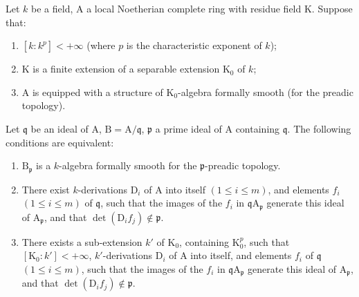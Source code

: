\begin{theorem}[22.7.3]
\label{0.22.7.3}
Let $k$ be a field, $\mathrm{A}$ a local Noetherian complete ring with residue field $\mathrm{K}$.
Suppose that:
\begin{enumerate}
  \item[$1^\circ$] $[k:k^p]<+\infty$ (where $p$ is the characteristic exponent of $k$);
  \item[$2^\circ$] $\mathrm{K}$ is a finite extension of a separable extension $\mathrm{K}_0$ of $k$;
  \item[$3^\circ$] $\mathrm{A}$ is equipped with a structure of $\mathrm{K}_0$-algebra formally smooth (for the preadic topology).
\end{enumerate}
Let $\mathfrak{q}$ be an ideal of $\mathrm{A}$, $\mathrm{B}=\mathrm{A}/\mathfrak{q}$, $\mathfrak{p}$ a prime ideal of $\mathrm{A}$ containing $\mathfrak{q}$.
The following conditions are equivalent:
\begin{enumerate}
  \item[\textup{a)}] $\mathrm{B}_\mathfrak{p}$ is a $k$-algebra formally smooth for the $\mathfrak{p}$-preadic topology.
  \item[\textup{b)}] There exist $k$-derivations $\mathrm{D}_i$ of $\mathrm{A}$ into itself $(1\leq i\leq m)$, and elements $f_i$ $(1\leq i\leq m)$ of $\mathfrak{q}$, such that the images of the $f_i$ in $\mathfrak{q}\mathrm{A}_\mathfrak{p}$ generate this ideal of $\mathrm{A}_\mathfrak{p}$, and that $\det(\mathrm{D}_if_j)\notin\mathfrak{p}$.
  \item[\textup{b')}] There exists a sub-extension $k'$ of $\mathrm{K}_0$, containing $\mathrm{K}_0^p$, such that $[\mathrm{K}_0:k']<+\infty$, $k'$-derivations $\mathrm{D}_i$ of $\mathrm{A}$ into itself, and elements $f_i$ of $\mathfrak{q}$ $(1\leq i\leq m)$, such that the images of the $f_i$ in $\mathfrak{q}\mathrm{A}_\mathfrak{p}$ generate this ideal of $\mathrm{A}_\mathfrak{p}$, and that $\det(\mathrm{D}_if_j)\notin\mathfrak{p}$.
\end{enumerate}
\end{theorem}

